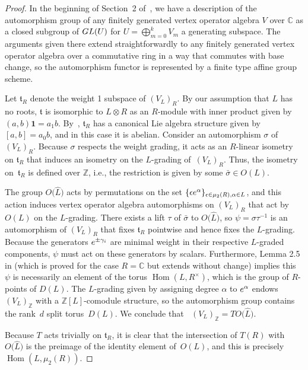 \documentclass[11pt]{article}
\newcommand{\bC}{\mathbb{C}}
\newcommand{\bZ}{\mathbb{Z}}
\newcommand{\unit}{\mathbf{1}}
\newcommand{\ft}{\mathfrak{t}}
\DeclareMathOperator{\uAut}{\underline{Aut}}
\DeclareMathOperator{\Hom}{Hom}
\theoremstyle{definition}
\begin{document}
\begin{proof}In the beginning of Section~2 of~\cite{DG01}, we have a description of the automorphism group of any finitely generated vertex operator algebra $V$ over $\bC$ as a closed subgroup of ${\rm GL}(U)$ for $U = \bigoplus_{m=0}^k V_m$ a generating subspace. The arguments given there extend straightforwardly to any finitely generated vertex operator algebra over a commutative ring in a way that commutes with base change, so the automorphism functor is represented by a finite type affine group scheme.

Let $\ft_R$ denote the weight 1 subspace of $(V_L)_R$. By our assumption that $L$ has no roots, $\ft$ is isomorphic to $L \otimes R$ as an $R$-module with inner product given by $(a,b)\unit = a_1 b$. By~\cite{B86}, $\ft_R$ has a canonical Lie algebra structure given by $[a,b] = a_0 b$, and in this case it is abelian. Consider an automorphism $\sigma$ of $(V_L)_R$. Because $\sigma$ respects the weight grading, it acts as an $R$-linear isometry on $\ft_R$ that induces an isometry on the $L$-grading of~$(V_L)_R$. Thus, the isometry on~$\ft_R$ is defined over $\bZ$, i.e., the restriction is given by some $\bar{\sigma} \in O(L)$.

The group $O\big(\hat{L}\big)$ acts by permutations on the set $\{ \epsilon {\rm e}^\alpha \}_{\epsilon \in \mu_2(R), \alpha \in L}$, and this action induces vertex operator algebra automorphisms on $(V_L)_R$ that act by $O(L)$ on the $L$-grading. There exists a lift $\tau$ of $\bar{\sigma}$ to $O\big(\hat{L}\big)$, so $\psi = \sigma \tau^{-1}$ is an automorphism of $(V_L)_R$ that fixes $\ft_R$ pointwise and hence fixes the $L$-grading. Because the generators ${\rm e}^{\pm \gamma_i}$ are minimal weight in their respective $L$-graded components, $\psi$ must act on these generators by scalars. Furthermore, Lemma 2.5 in \cite{DN98} (which is proved for the case $R = \bC$ but extends without change) implies this $\psi$ is necessarily an element of the torus $\Hom(L, R^\times)$, which is the group of $R$-points of $D(L)$. The $L$-grading given by assigning degree $\alpha$ to ${\rm e}^\alpha$ endows $(V_L)_\bZ$ with a $\bZ[L]$-comodule structure, so the automorphism group contains the rank~$d$ split torus~$D(L)$. We conclude that $\uAut(V_L)_\bZ = T O\big(\hat{L}\big)$.

Because $T$ acts trivially on $\ft_R$, it is clear that the intersection of $T(R)$ with $O\big(\hat{L}\big)$ is the preimage of the identity element of~$O(L)$, and this is precisely $\Hom(L,\mu_2(R))$.
\end{proof}
\end{document}
